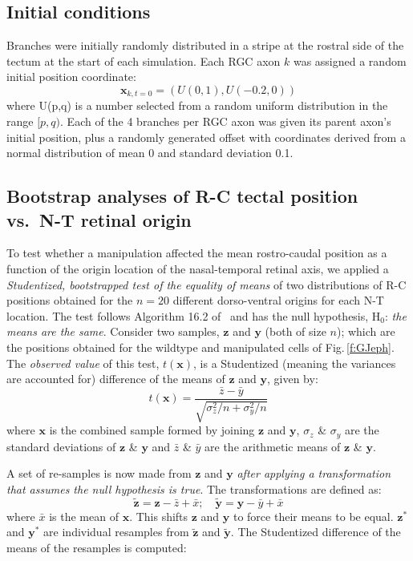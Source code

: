 \documentclass[11pt, a4paper]{article}
\begin{document}
\subsection*{Initial conditions}
Branches were initially randomly distributed in a stripe at the rostral side of the tectum at the start of each simulation.
Each RGC axon $k$ was assigned a random initial position coordinate:
\begin{equation}\label{e:ic}
\mathbf{x}_{k,t=0} = (U(0,1), U(-0.2,0))
\end{equation}
where U(p,q) is a number selected from a random uniform distribution in the range $[p,q)$. Each of the 4 branches per RGC axon was given its parent axon's initial position, plus a randomly generated offset with coordinates derived from a normal distribution of mean 0 and standard deviation 0.1.

\subsection*{Bootstrap analyses of R-C tectal position vs.~N-T retinal origin}

To test whether a manipulation affected the mean rostro-caudal position as a function of the origin location of the nasal-temporal retinal axis, we applied a \emph{Studentized, bootstrapped test of the equality of means} of two distributions of R-C positions obtained for the $n=20$ different dorso-ventral origins for each N-T location.
The test follows Algorithm 16.2 of~\cite{efron_introduction_1993} and has the null hypothesis, H$_0$: \emph{the means are the same}.
Consider two samples, $\textbf{z}$ and $\textbf{y}$ (both of size $n$); which are the positions obtained for the wildtype and manipulated cells of Fig.\,\ref{f:GJeph}.
The \emph{observed value} of this test, $t(\textbf{x})$, is a Studentized (meaning the variances are accounted for) difference of the means of $\textbf{z}$ and $\textbf{y}$, given by:
%
$$t(\textbf{x}) =  \frac{\bar{z} - \bar{y}}{\sqrt{\sigma_{z}^2/n + \sigma_{y}^2/n} } $$
%
where $\textbf{x}$ is the combined sample formed by joining $\textbf{z}$ and $\textbf{y}$, $\sigma_z$ \& $\sigma_y$ are the standard deviations of $\textbf{z}$ \& $\textbf{y}$ and $\bar{z}$ \& $\bar{y}$ are the arithmetic means of $\textbf{z}$ \& $\textbf{y}$.

A set of re-samples is now made from $\textbf{z}$ and $\textbf{y}$ \emph{after applying a transformation that assumes the null hypothesis is true}.
The transformations are defined as:
%
$$ \tilde{\textbf{z}} = \textbf{z} - \bar{z} + \bar{x}; \quad \tilde{\textbf{y}} = \textbf{y} - \bar{y} + \bar{x} $$
%
where $\bar{x}$ is the mean of $\textbf{x}$. This shifts $\textbf{z}$ and $\textbf{y}$ to force their means to be equal.
$\textbf{z}^*$ and $\textbf{y}^*$ are individual resamples from $\tilde{\textbf{z}}$ and $\tilde{\textbf{y}}$.
The Studentized difference of the means of the resamples is computed:
\end{document}

